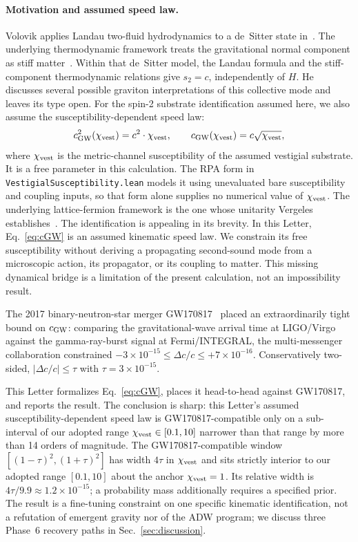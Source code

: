 \documentclass[aps,prl,reprint,nofootinbib,superscriptaddress]{revtex4-2}
\newcommand{\cGW}{c_{\rm GW}}
\newcommand{\chivest}{\chi_{\rm vest}}
\newcommand{\dccap}{\Delta c/c}
\begin{document}
\paragraph{Motivation and assumed speed law.}
Volovik applies Landau two-fluid hydrodynamics to a de~Sitter
state in~\cite{Volovik2026SecondSound}.
The underlying thermodynamic framework treats the gravitational
normal component as stiff matter~\cite{Volovik2024VacuumDecay}.
Within that de~Sitter model, the Landau formula and the stiff-component
thermodynamic relations give $s_2=c$, independently of $H$.
He discusses several possible graviton interpretations of this
collective mode and leaves its type open.
For the spin-2 substrate identification assumed here, we also assume
the susceptibility-dependent speed law:
\begin{equation}
  \cGW^2(\chivest) = c^2 \cdot \chivest, \qquad
  \cGW(\chivest) = c\sqrt{\chivest},
  \label{eq:cGW}
\end{equation}
where $\chivest$ is the metric-channel susceptibility of the
assumed vestigial substrate.
It is a free parameter in this calculation.
The RPA form in \texttt{VestigialSusceptibility.lean} models it using
unevaluated bare susceptibility and coupling inputs, so that form
alone supplies no numerical value of $\chivest$.
The underlying
lattice-fermion framework is the one whose unitarity Vergeles
establishes~\cite{Vergeles2025}. The identification is appealing in its
brevity. In this Letter, Eq.~\eqref{eq:cGW} is an assumed kinematic speed law.
We constrain its free susceptibility without deriving a propagating
second-sound mode from a microscopic action, its propagator, or its
coupling to matter. This missing dynamical bridge is a limitation of
the present calculation, not an impossibility result.

The 2017 binary-neutron-star merger
GW170817~\cite{Abbott2017GW170817} placed an extraordinarily tight
bound on $\cGW$: comparing the gravitational-wave arrival time at
LIGO/Virgo against the gamma-ray-burst signal at Fermi/INTEGRAL,
the multi-messenger collaboration constrained
$-3 \times 10^{-15} \leq \dccap \leq +7 \times 10^{-16}$.
Conservatively two-sided, $|\dccap| \leq \tau$ with
$\tau = 3 \times 10^{-15}$.

This Letter formalizes Eq.~\eqref{eq:cGW}, places it head-to-head
against GW170817, and reports the result. The conclusion is sharp:
this Letter's assumed susceptibility-dependent speed law is
GW170817-compatible only on a sub-interval of our adopted range
$\chivest \in [0.1,10]$ narrower than that range by more than
14 orders of magnitude. The
GW170817-compatible window $[(1-\tau)^2, (1+\tau)^2]$ has width
$4\tau$ in $\chivest$ and sits strictly interior to our adopted range
$[0.1, 10]$ about the anchor $\chivest = 1$.
Its relative width is $4\tau/9.9 \approx 1.2\times10^{-15}$;
a probability mass additionally requires a specified prior. The result is a fine-tuning constraint on one specific
kinematic identification, not a refutation of emergent
gravity nor of the ADW program; we discuss three Phase~6 recovery
paths in Sec.~\ref{sec:discussion}.
\end{document}
